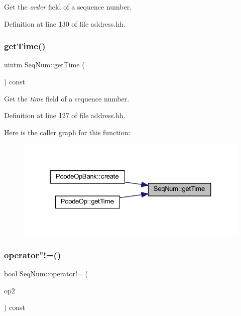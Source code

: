 Get the {\itshape order} field of a sequence number. 



Definition at line 130 of file address.\+hh.

\mbox{\label{class_seq_num_a1f19fed862621e856d70dda65731c94c}} 
\subsubsection{\texorpdfstring{getTime()}{getTime()}}
{\footnotesize\ttfamily uintm Seq\+Num\+::get\+Time (\begin{DoxyParamCaption}\item[{void}]{ }\end{DoxyParamCaption}) const\hspace{0.3cm}{\ttfamily [inline]}}



Get the {\itshape time} field of a sequence number. 



Definition at line 127 of file address.\+hh.

Here is the caller graph for this function\+:
\nopagebreak
\begin{figure}[H]
\begin{center}
\leavevmode
\includegraphics[width=324pt]{class_seq_num_a1f19fed862621e856d70dda65731c94c_icgraph}
\end{center}
\end{figure}
\mbox{\label{class_seq_num_a25f1e1917e1070653d4d934593525b97}} 
\subsubsection{\texorpdfstring{operator"!=()}{operator!=()}}
{\footnotesize\ttfamily bool Seq\+Num\+::operator!= (\begin{DoxyParamCaption}\item[{const \mbox{\hyperlink{class_seq_num}{Seq\+Num}} \&}]{op2 }\end{DoxyParamCaption}) const\hspace{0.3cm}{\ttfamily [inline]}}



